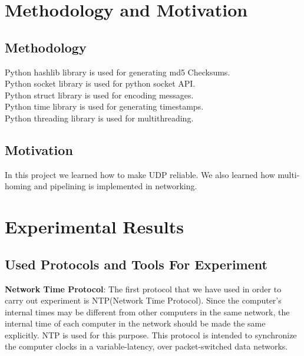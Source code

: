 \documentclass[conference]{IEEEtran}
\begin{document}
\section{Methodology and Motivation}
\subsection{Methodology}
Python hashlib library is used for generating md5 Checksums. \\
Python socket library is used for python socket API. \\
Python struct library is used for encoding messages. \\
Python time library is used for generating timestamps. \\
Python threading library is used for multithreading.


\subsection{Motivation}
In this project we learned how to make UDP reliable. We also learned how multi-homing and pipelining is implemented in networking. \\

\section{Experimental Results}
\subsection{Used Protocols and Tools For Experiment}
\textbf{Network Time Protocol}:
The first protocol that we have used in order to carry out experiment is NTP(Network Time Protocol).
Since the computer's internal times may be different from other computers in the same network, the internal time of each computer in the network should be made the same explicitly. NTP is used for this purpose. This protocol is intended to synchronize the computer clocks in a variable-latency, over packet-switched data networks. 
\end{document}
